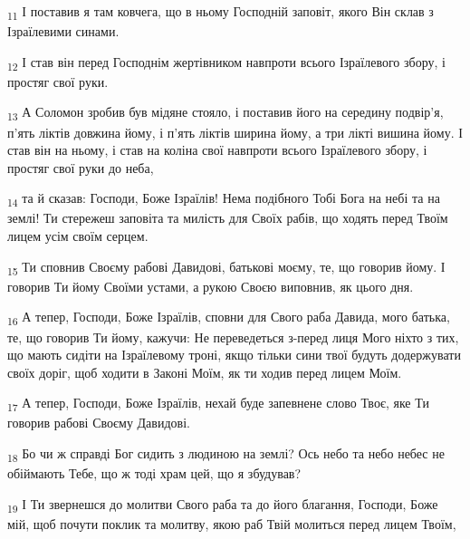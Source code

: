 \begin{tcolorbox}
\textsubscript{11} І поставив я там ковчега, що в ньому Господній заповіт, якого Він склав з Ізраїлевими синами.
\end{tcolorbox}
\begin{tcolorbox}
\textsubscript{12} І став він перед Господнім жертівником навпроти всього Ізраїлевого збору, і простяг свої руки.
\end{tcolorbox}
\begin{tcolorbox}
\textsubscript{13} А Соломон зробив був мідяне стояло, і поставив його на середину подвір'я, п'ять ліктів довжина йому, і п'ять ліктів ширина йому, а три лікті вишина йому. І став він на ньому, і став на коліна свої навпроти всього Ізраїлевого збору, і простяг свої руки до неба,
\end{tcolorbox}
\begin{tcolorbox}
\textsubscript{14} та й сказав: Господи, Боже Ізраїлів! Нема подібного Тобі Бога на небі та на землі! Ти стережеш заповіта та милість для Своїх рабів, що ходять перед Твоїм лицем усім своїм серцем.
\end{tcolorbox}
\begin{tcolorbox}
\textsubscript{15} Ти сповнив Своєму рабові Давидові, батькові моєму, те, що говорив йому. І говорив Ти йому Своїми устами, а рукою Своєю виповнив, як цього дня.
\end{tcolorbox}
\begin{tcolorbox}
\textsubscript{16} А тепер, Господи, Боже Ізраїлів, сповни для Свого раба Давида, мого батька, те, що говорив Ти йому, кажучи: Не переведеться з-перед лиця Мого ніхто з тих, що мають сидіти на Ізраїлевому троні, якщо тільки сини твої будуть додержувати своїх доріг, щоб ходити в Законі Моїм, як ти ходив перед лицем Моїм.
\end{tcolorbox}
\begin{tcolorbox}
\textsubscript{17} А тепер, Господи, Боже Ізраїлів, нехай буде запевнене слово Твоє, яке Ти говорив рабові Своєму Давидові.
\end{tcolorbox}
\begin{tcolorbox}
\textsubscript{18} Бо чи ж справді Бог сидить з людиною на землі? Ось небо та небо небес не обіймають Тебе, що ж тоді храм цей, що я збудував?
\end{tcolorbox}
\begin{tcolorbox}
\textsubscript{19} І Ти звернешся до молитви Свого раба та до його благання, Господи, Боже мій, щоб почути поклик та молитву, якою раб Твій молиться перед лицем Твоїм,
\end{tcolorbox}
